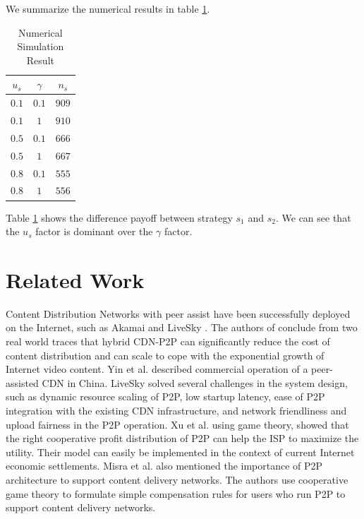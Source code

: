 \documentclass[paper]{ieice}
\begin{document}
We summarize the numerical results in table \ref{table:2}.
\begin{table}[hb]%
\caption{Numerical Simulation Result}
\label{table:2}
\begin{center}
\begin{tabular}{c|c|c}
\hline
$u_s$ & $\gamma$ & $n_s$ \\
\hline
$0.1$ & $0.1$ & $909$ \\
\hline
$0.1$ & $1$ & $910$ \\
\hline
$0.5$ & $0.1$ & $666$ \\
\hline
$0.5$ & $1$ & $667$\\
\hline
$0.8$ & $0.1$ & $555$ \\
\hline
$0.8$ & $1$ & $556$ \\
\hline
\end{tabular}
\end{center}
\end{table}

Table \ref{table:2} shows the difference payoff between strategy $s_1$ and $s_2$.
We can see that the $u_s$ factor is dominant over the $\gamma$ factor. 


\section{Related Work} 

Content Distribution Networks with peer assist have been successfully deployed on the Internet, such as Akamai \cite{Huang:2008:UHC:1496046.1496064} and LiveSky \cite{Yin:2010:LEC:1823746.1823750}.  
The authors of \cite{Huang:2008:UHC:1496046.1496064} conclude from two real world traces that hybrid CDN-P2P can significantly reduce the cost of content distribution and can scale to cope with the exponential growth of Internet video content.  
Yin et al. \cite{Yin:2010:LEC:1823746.1823750} described commercial operation of a peer-assisted CDN in China.  
LiveSky solved several challenges in the system design, such as dynamic resource scaling of P2P, low startup latency, ease of P2P integration with the existing CDN infrastructure, and network friendliness and upload fairness in the P2P operation.  
Xu et al.\cite{DBLP:journals/corr/abs-1212-4915} using game theory, showed that the right cooperative profit distribution of P2P can help the ISP to maximize the utility.  
Their model can easily be implemented in the context of current Internet economic settlements.  
Misra et al.\cite{Misra:2010:IPS:1811099.1811064} also mentioned the importance of P2P architecture to support content delivery networks.
The authors use cooperative game theory to formulate simple compensation rules for users who run P2P to support content delivery networks.
\end{document}
